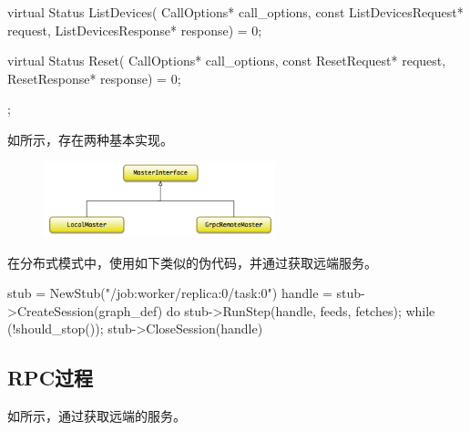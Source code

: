 \begin{content}
\begin{leftbar}
\begin{c++}
{  virtual Status ListDevices(
    CallOptions* call_options,
    const ListDevicesRequest* request,
    ListDevicesResponse* response) = 0;

  virtual Status Reset(
    CallOptions* call_options, const ResetRequest* request,
    ResetResponse* response) = 0;
};
\end{c++}
\end{leftbar}

如所示，存在两种基本实现。

\begin{enum}
\end{enum}

\begin{figure}[H]
\centering
\includegraphics[width=0.6\textwidth]{figures/dist-master-interface.png}
\caption{}
 \label{fig:dist-master-interface}
\end{figure}

在分布式模式中，使用如下类似的伪代码，并通过获取远端服务。

\begin{leftbar}
\begin{c++}
stub = NewStub("/job:worker/replica:0/task:0")
handle = stub->CreateSession({graph_def})
do {
  stub->RunStep(handle, feeds, fetches);
} while (!should_stop());
stub->CloseSession({handle})
\end{c++}
\end{leftbar}

\subsection{RPC过程}

如所示，通过获取远端的服务。


\end{content}
